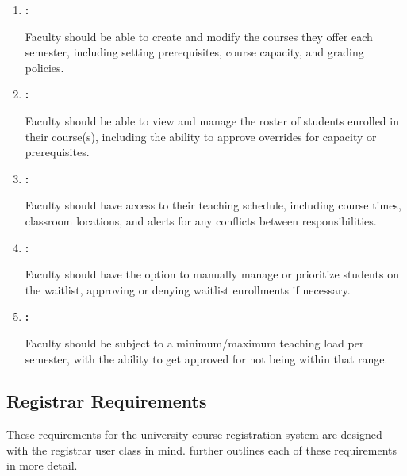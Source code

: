 \begin{enumerate}

\item{\textbf{:}}

Faculty should be able to create and modify the courses they offer each semester, including setting prerequisites, course capacity, and grading \gls{policies}.

\item{\textbf{:}}

Faculty should be able to view and manage the roster of students enrolled in their course(s), including the ability to approve overrides for capacity or prerequisites.

\item{\textbf{:}}

Faculty should have access to their teaching schedule, including course times, classroom locations, and alerts for any conflicts between responsibilities.

\item{\textbf{:}}

Faculty should have the option to manually manage or prioritize students on the \gls{waitlist}, approving or denying \gls{waitlist} \gls{enrollment}s if necessary.

\item{\textbf{:}}

Faculty should be subject to a minimum/maximum teaching load per semester, with the ability to get approved for not being within that range.

\end{enumerate}

\subsection{Registrar Requirements}
These requirements for the university course registration system are designed with the registrar user class in mind.  further outlines each of these requirements in more detail.

